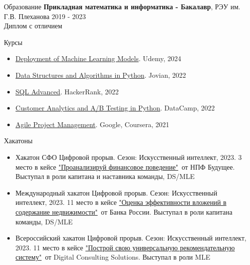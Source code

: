 \documentclass{resume}  %
\begin{document}

\begin{rSection}{Образование}
   {\bf Прикладная математика и информатика - Бакалавр}, РЭУ им. Г.В. Плеханова \hfill {2019 - 2023}\\
   Диплом с отличием
\end{rSection}

\begin{rSection}{Курсы}
   \begin{itemize}
      \itemsep -6pt {}
      \item \href{https://www.udemy.com/certificate/UC-5696cb94-0706-4577-9666-2f3f6b4ace5f/}{Deployment of Machine Learning Models}. Udemy, 2024
      \item \href{https://jovian.com/certificate/MFQTOOJUGA}{Data Structures and Algorithms in Python}. Jovian, 2022
      \item \href{https://www.hackerrank.com/certificates/cfb6b0d6f9fa}{SQL Advanced}. HackerRank, 2022
      \item \href{https://www.datacamp.com/completed/statement-of-accomplishment/course/545c2bf2475d2e684ed8869b624a8af044d56621}{Customer Analytics and A/B Testing in Python}. DataCamp, 2022
      \item \href{https://www.coursera.org/account/accomplishments/certificate/KXUHDPADQSW7}{Agile Project Management}. Google, Coursera, 2021
   \end{itemize}
\end{rSection}


\begin{rSection}{Хакатоны}
   \begin{itemize}
      \itemsep -5pt {}
      \item Хакатон СФО Цифровой прорыв. Сезон: Искусственный интеллект, 2023. 3 место в кейсе \href{https://github.com/orgs/OBeMeHacks/repositories}{"Проанализируй финансовое поведение"}\ от НПФ Будущее. Выступал в роли капитана и наставника команды, DS/MLE
      \item Международный хакатон Цифровой прорыв. Сезон: Искусственный интеллект, 2023. 11 место в кейсе \href{https://github.com/orgs/obm-hacks/repositories}{"Оценка эффективности вложений в содержание недвижимости"}\ от Банка России. Выступал в роли капитана команды, DS/MLE
      \item Всероссийский хакатон Цифровой прорыв. Сезон: Искусственный интеллект, 2023. 11 место в кейсе \href{https://github.com/VladOnMyOwn/hacks_ai_dsc}{"Построй свою универсальную рекомендательную систему"}\ от Digital Consulting Solutions. Выступал в роли MLE
   \end{itemize}
\end{rSection}
\end{document}
